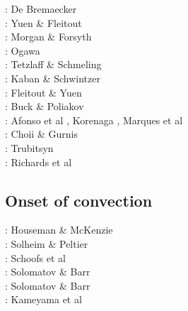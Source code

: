 \begin{scriptsize}
\nineteenseventyseven: De Bremaecker \cite{debr77}\\
\nineteeneightyfour: Yuen \& Fleitout \cite{yufl84}\\
\nineteeneightyeight: Morgan \& Forsyth \cite{mofo88}\\
\nineteenninety: Ogawa \cite{ogaw90} \\
\twothousand: Tetzlaff \& Schmeling \cite{tesc00}\\
\twothousandone: Kaban \& Schwintzer \cite{kasc01}\\
\nineteeneightyfour: Fleitout \& Yuen \cite{flyu84} \\
\nineteenninetyeight: Buck \& Poliakov \cite{bupo98}\\
\twothousandseven: Afonso et al \cite{afrf07}, Korenaga \cite{kore07}, Marques et al \cite{macl07}\\
\twothousandeight: Choii \& Gurnis \cite{chgu08}\\
\twothousandtwelve: Trubitsyn \cite{trub12} \\
\twothousandeighteen: Richards et al \cite{rihc18}
\end{scriptsize}

\subsection{Onset of convection}

\begin{scriptsize}
\noindent
\nineteeneightytwo: Houseman \& McKenzie \cite{homc82}\\
\nineteenninety: Solheim \& Peltier \cite{sope90}\\
\twothousand: Schoofs et al \cite{scth00}\\
\twothousandsix: Solomatov \& Barr \cite{soba06}\\
\twothousandseven: Solomatov \& Barr \cite{soba07}\\
\twothousandfifteen: Kameyama et al \cite{kamo15}
\end{scriptsize}

